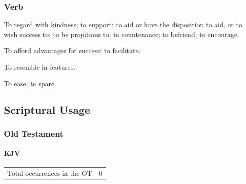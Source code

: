 	\subsubsection{Verb}

		\begin{compactitem}
			\item[1] To regard with kindness; to support; to aid or have the disposition to aid, or to wish success to; to be propitious to; to countenance; to befriend; to encourage. 
			\item[2] To afford advantages for success; to facilitate. 
			\item[3] To resemble in features.
			\item[4] To ease; to spare.
		\end{compactitem}



\subsection{Scriptural Usage} %
	\label{FAVOR-SCRIPTURES}

	\subsubsection{Old Testament} %
		\label{FAVOR-OT}
	
		\paragraph{KJV}
			\label{FAVOR-OT-KJV}
	
			\begin{tabular}{ll}
				Total occurrences in the OT & 0
			\end{tabular}
			
			
